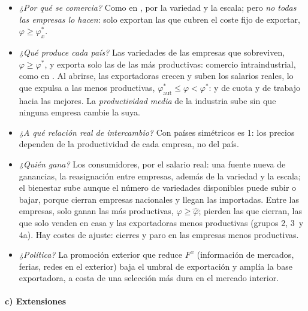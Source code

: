 \documentclass[11pt]{article}
\begin{document}
\begin{itemize}
\item \emph{¿Por qué se comercia?} Como en , por la variedad y la escala; pero \emph{no todas las empresas lo hacen}: solo exportan las que cubren el coste fijo de exportar, $\varphi\geq\varphi^*_x$.
\item \emph{¿Qué produce cada país?} Las variedades de las empresas que sobreviven, $\varphi\geq\varphi^*$, y exporta solo las de las más productivas: comercio intraindustrial, como en . Al abrirse, las exportadoras crecen y suben los salarios reales, lo que expulsa a las menos productivas, $\varphi^*_{\mathrm{aut}}\leq\varphi<\varphi^*$:  y  de cuota y de trabajo hacia las mejores. La \emph{productividad media} de la industria sube sin que ninguna empresa cambie la suya.
\item \emph{¿A qué relación real de intercambio?} Con países simétricos es 1: los precios dependen de la productividad de cada empresa, no del país.
\item \emph{¿Quién gana?} Los consumidores, por el salario real: una fuente nueva de ganancias, la reasignación entre empresas, además de la variedad y la escala; el bienestar sube aunque el número de variedades disponibles puede subir o bajar, porque cierran empresas nacionales y llegan las importadas\nocite{Melitz2003Impact}. Entre las empresas, solo ganan las más productivas, $\varphi\geq\hat\varphi$; pierden las que cierran, las que solo venden en casa y las exportadoras menos productivas (grupos 2, 3~y 4a). Hay costes de ajuste: cierres y paro en las empresas menos productivas.
\item \emph{¿Política?} La promoción exterior que reduce $F^x$ (información de mercados, ferias, redes en el exterior) baja el umbral de exportación y amplía la base exportadora, a costa de una selección más dura en el mercado interior.
\end{itemize}

\paragraph{c) Extensiones}
\end{document}
